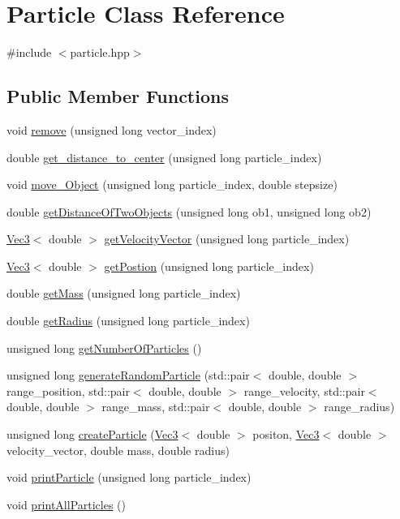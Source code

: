 \hypertarget{classParticle}{}\section{Particle Class Reference}
\label{classParticle}


{\ttfamily \#include $<$particle.\+hpp$>$}

\subsection*{Public Member Functions}
\begin{DoxyCompactItemize}
\item 
void \hyperlink{classParticle_a1b9b969dd9c1d2a8147640bde85913ca}{remove} (unsigned long vector\+\_\+index)
\item 
double \hyperlink{classParticle_abf747e26491e7a7af1792aa7d0d69aef}{get\+\_\+distance\+\_\+to\+\_\+center} (unsigned long particle\+\_\+index)
\item 
void \hyperlink{classParticle_a812541c1de4b92e764b5949310781ec2}{move\+\_\+\+Object} (unsigned long particle\+\_\+index, double stepsize)
\item 
double \hyperlink{classParticle_aeea985651cf29b2fdd368fec991961a8}{get\+Distance\+Of\+Two\+Objects} (unsigned long ob1, unsigned long ob2)
\item 
\hyperlink{classVec3}{Vec3}$<$ double $>$ \hyperlink{classParticle_a2c1432771a7136cefed15c4032492386}{get\+Velocity\+Vector} (unsigned long particle\+\_\+index)
\item 
\hyperlink{classVec3}{Vec3}$<$ double $>$ \hyperlink{classParticle_a2f3fc4edec7970f4f4c2894c145fda78}{get\+Postion} (unsigned long particle\+\_\+index)
\item 
double \hyperlink{classParticle_abfd6556526b15b5bee3384ae7baec48b}{get\+Mass} (unsigned long particle\+\_\+index)
\item 
double \hyperlink{classParticle_a699d893583b4fabeffd48c0a509bd50e}{get\+Radius} (unsigned long particle\+\_\+index)
\item 
unsigned long \hyperlink{classParticle_a06514801da39b213dc9d408d40e2adc1}{get\+Number\+Of\+Particles} ()
\item 
unsigned long \hyperlink{classParticle_af9d4982b196dbcaf9cdf59377dd5b2ee}{generate\+Random\+Particle} (std\+::pair$<$ double, double $>$ range\+\_\+position, std\+::pair$<$ double, double $>$ range\+\_\+velocity, std\+::pair$<$ double, double $>$ range\+\_\+mass, std\+::pair$<$ double, double $>$ range\+\_\+radius)
\item 
unsigned long \hyperlink{classParticle_ad13916c98c9d37de12420205299f1e2a}{create\+Particle} (\hyperlink{classVec3}{Vec3}$<$ double $>$ positon, \hyperlink{classVec3}{Vec3}$<$ double $>$ velocity\+\_\+vector, double mass, double radius)
\item 
void \hyperlink{classParticle_ac68f9be7c033bc006fac8b90b31fad6b}{print\+Particle} (unsigned long particle\+\_\+index)
\item 
void \hyperlink{classParticle_a9acb129d789df24580508e20816f2922}{print\+All\+Particles} ()
\end{DoxyCompactItemize}


